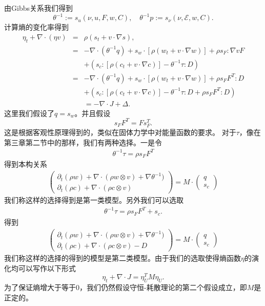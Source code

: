 \documentclass{article}
\begin{document}
由Gibbs关系我们得到
$$\theta^{-1}:=s_{u} (\nu,u,F, w,C), \quad \theta^{-1} p := s_\nu (\nu,\mathcal{E},w,C).$$
计算熵的变化率得到
\begin{eqnarray*}
		\eta_t + \nabla \cdot (\eta v) &=& \rho (s_t + v \cdot \nabla s), \\
		&=& -\nabla \cdot (\theta^{-1} q) + s_w \cdot [\rho (w_t + v \cdot \nabla w)] + \rho s_F : \nabla v F  \\
		&& + (s_c:[\rho (c_t + v \cdot \nabla c)] - \theta^{-1} \tau : D) \\
		&=& -\nabla \cdot (\theta^{-1} q) + s_w \cdot [\rho (w_t + v \cdot \nabla w)] + \rho s_F F^T : D  \\
		&& + (s_c:[\rho (c_t + v \cdot \nabla c)] - \theta^{-1} \tau : D + \rho s_F F^T : D)  \\
		&& = -\nabla \cdot J + \Delta.
\end{eqnarray*}
这里我们假设了$q=s_w$。并且假设
\begin{equation}
	s_F F^T = F s_F^T.	
\end{equation}
这是根据客观性原理得到的\cite{}，类似在固体力学中对能量函数的要求。
对于$\tau$，像在第三章第二节中的那样，我们有两种选择。一是令
\begin{eqnarray*}
\theta^{-1} \tau = \rho s_F F^T 
\end{eqnarray*}
得到本构关系
\begin{eqnarray}\label{eq:finite1}
\left( \begin{array}{c} \partial_t (\rho w) + \nabla \cdot (\rho w \otimes v) + \nabla \theta^{-1}) \\
	\partial_t (\rho c) + \nabla \cdot (\rho c \otimes v) \end{array} \right)
=
M \cdot \left( \begin{array}{c} q \\ s_c \end{array} \right)
\end{eqnarray}
我们称这样的选择得到是第一类模型。另外我们可以选取
\begin{eqnarray*}
	\theta^{-1} \tau = \rho s_F F^T + s_c.
\end{eqnarray*}
得到
\begin{eqnarray}\label{eq:finite2}
\left( \begin{array}{c} \partial_t (\rho w) + \nabla \cdot (\rho w \otimes v) + \nabla \theta^{-1}) \\
	\partial_t (\rho c) + \nabla \cdot (\rho c \otimes v) - D \end{array} \right)
=
M \cdot \left( \begin{array}{c} q \\ s_c  \end{array} \right)
\end{eqnarray}
我们称这样的选择的得到的模型是第二类模型。由于我们的选取使得熵函数$\eta$的演化均可以写作以下形式
\begin{equation}\label{eq:entropypro}
	\eta_t + \nabla \cdot J = \eta_U^T M \eta_U.
\end{equation}
为了保证熵增大于等于$0$，我们仍然假设守恒-耗散理论的第二个假设成立，即$M$是正定的。
\end{document}
